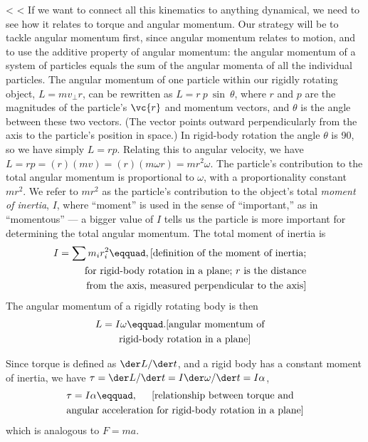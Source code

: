 <%
<%
If we want to connect all this kinematics to anything
dynamical, we need to see how it relates to torque and
angular momentum. Our strategy will be to tackle angular
momentum first, since angular momentum relates to motion,
and to use the additive property of angular momentum: the
angular momentum of a system of particles equals the sum of
the angular momenta of all the individual particles. The
angular momentum of one particle within our
rigidly rotating object, $L=mv_\perp r$, can be rewritten as
$L=r\:p\:\sin\:\theta$, where $r$ and $p$ are the
magnitudes of the particle's $\vc{r}$ and momentum vectors, and $\theta$
is the angle between these two vectors. (The  vector points
outward perpendicularly from the axis to the particle's
position in space.) In rigid-body rotation the angle $\theta$ is
90\degunit, so we have simply $L=r p$. Relating this to angular
velocity, we have $L=rp=(r)(mv)=(r)(m\omega r)=mr^2\omega$. The particle's
contribution to the total angular momentum is proportional
to $\omega$, with a proportionality constant $mr^2$. We refer to $mr^2$
as the particle's contribution to the object's total \emph{moment
of inertia},
 $I$, where ``moment'' is used in the sense of
``important,'' as in ``momentous''  --- a bigger value of $I$
tells us the particle is more important for determining the
total angular momentum. The total moment of inertia
is
\begin{multline*}
        I        =          \sum{m_i r_i^2}\eqquad,
                 \hfill \shoveright{\text{[definition of the moment of inertia;}} \\
                \hfill \shoveright{\text{for rigid-body
                rotation in a plane; $r$ is the distance}}\\
                \hfill \shoveright{\text{from the axis, measured perpendicular
                to the axis]}}
\end{multline*}
The angular momentum of a rigidly rotating body is then
\begin{multline*}
        L        =  I \omega\eqquad. \hfill
                        \shoveright{\text{[angular momentum of}}\\
        \text{rigid-body rotation in a plane]}
\end{multline*}

Since torque is defined as $\der L/\der t$, and a rigid body has
a constant moment of inertia, we have $\tau=\der L/\der t
=I\der\omega/\der t=I\alpha$,
\begin{multline*}
        \tau        =  I \alpha\eqquad,        \hfill
                \shoveright{\text{[relationship between torque and}}\\
        \text{angular acceleration for rigid-body rotation in a plane]}
\end{multline*}
which is analogous to $F=ma$.

